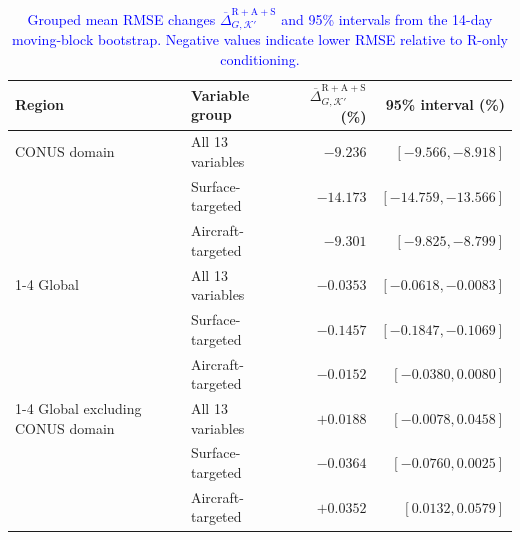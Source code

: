 \begin{table}[htbp]
\centering
\small
\caption{\textcolor{blue}{Grouped mean RMSE changes
$\overline{\Delta}_{G,\mathcal K'}^{\mathrm{R+A+S}}$ and 95\% intervals from
the 14-day moving-block bootstrap. Negative values indicate lower RMSE relative
to R-only conditioning.}}
\label{tab:block_bootstrap_final}
\renewcommand{\arraystretch}{1.08}
\begin{tabular*}{\textwidth}{@{\extracolsep{\fill}}llrr@{}}
\toprule
Region & Variable group &
$\overline{\Delta}_{G,\mathcal K'}^{\mathrm{R+A+S}}$ (\%) &
95\% interval (\%) \\
\midrule
CONUS domain & All 13 variables & $\mathbf{-9.236}$ & $\mathbf{[-9.566,-8.918]}$ \\
             & Surface-targeted & $\mathbf{-14.173}$ & $\mathbf{[-14.759,-13.566]}$ \\
             & Aircraft-targeted & $\mathbf{-9.301}$ & $\mathbf{[-9.825,-8.799]}$ \\
\cmidrule(lr){1-4}
Global       & All 13 variables & $-0.0353$ & $[-0.0618,-0.0083]$ \\
             & Surface-targeted & $-0.1457$ & $[-0.1847,-0.1069]$ \\
             & Aircraft-targeted & $-0.0152$ & $[-0.0380,0.0080]$ \\
\cmidrule(lr){1-4}
Global excluding CONUS domain & All 13 variables & $+0.0188$ & $[-0.0078,0.0458]$ \\
              & Surface-targeted & $-0.0364$ & $[-0.0760,0.0025]$ \\
              & Aircraft-targeted & $+0.0352$ & $[0.0132,0.0579]$ \\
\bottomrule
\end{tabular*}
\end{table}
